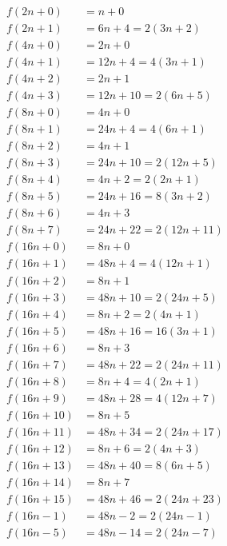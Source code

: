 \begin{align*}
    f(2n+0) &= n+0
    \\
    f(2n+1) &= 6n+4 = 2(3n+2)
    \\
    f(4n+0) &= 2n+0
    \\
    f(4n+1) &= 12n+4 = 4(3n+1)
    \\
    f(4n+2) &= 2n+1
    \\
    f(4n+3) &= 12n+10 = 2(6n+5)
    \\
    f(8n+0) &= 4n+0
    \\
    f(8n+1) &= 24n+4 = 4(6n+1)
    \\
    f(8n+2) &= 4n+1
    \\
    f(8n+3) &= 24n+10 = 2(12n+5)
    \\
    f(8n+4) &= 4n+2 = 2(2n+1)
    \\
    f(8n+5) &= 24n+16 = 8(3n+2)
    \\
    f(8n+6) &= 4n+3
    \\
    f(8n+7) &= 24n+22 = 2(12n+11)
    \\
    f(16n+0) &= 8n+0
    \\
    f(16n+1) &= 48n+4 = 4(12n+1)
    \\
    f(16n+2) &= 8n+1
    \\
    f(16n+3) &= 48n+10 = 2(24n+5)
    \\
    f(16n+4) &= 8n+2 = 2(4n+1)
    \\
    f(16n+5) &= 48n+16 = 16(3n+1)
    \\
    f(16n+6) &= 8n+3
    \\
    f(16n+7) &= 48n+22 = 2(24n+11)
    \\
    f(16n+8) &= 8n+4 = 4(2n+1)
    \\
    f(16n+9) &= 48n+28 = 4(12n+7)
    \\
    f(16n+10) &= 8n+5
    \\
    f(16n+11) &= 48n+34 = 2(24n+17)
    \\
    f(16n+12) &= 8n+6 = 2(4n+3)
    \\
    f(16n+13) &= 48n+40 = 8(6n+5)
    \\
    f(16n+14) &= 8n+7
    \\
    f(16n+15) &= 48n+46 = 2(24n+23)
    \\
    f(16n-1) &= 48n-2 = 2(24n-1)
    \\
    f(16n-5) &= 48n-14 = 2(24n-7)
\end{align*}

